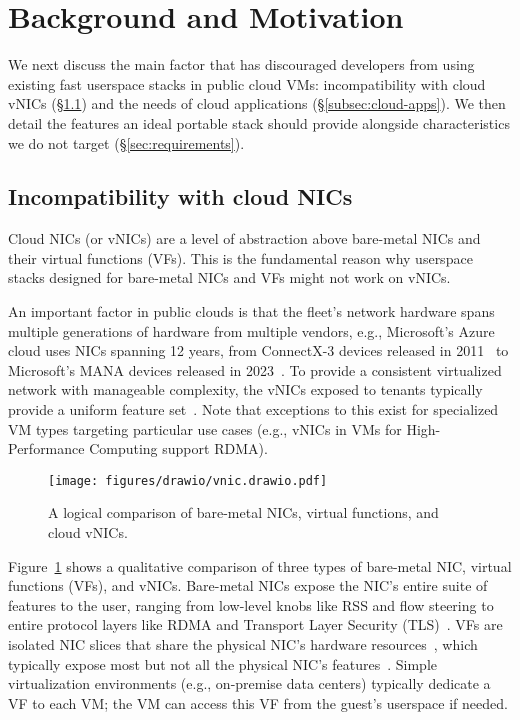 \section{Background and Motivation}
\label{sec:background}
We next discuss the main factor that has discouraged developers from using existing fast userspace stacks in public cloud VMs: incompatibility with cloud vNICs (\S\ref{sec:limitations-of-vnics}) and the needs of cloud applications (\S\ref{subsec:cloud-apps}).
We then detail the features an ideal portable stack should provide alongside characteristics we do not target (\S\ref{sec:requirements}).

\subsection{Incompatibility with cloud NICs}
\label{sec:limitations-of-vnics}
Cloud NICs (or vNICs) are a level of abstraction above bare-metal NICs and their virtual functions (VFs).
This is the fundamental reason why userspace stacks designed for bare-metal NICs and VFs might not work on vNICs.

An important factor in public clouds is that the fleet's network hardware spans multiple generations of hardware from multiple vendors, e.g., Microsoft's Azure cloud uses NICs spanning 12 years, from ConnectX-3 devices released in 2011~\cite{connectx3} to Microsoft's MANA devices released in 2023~\cite{mana, mana-kernel}.
To provide a consistent virtualized network with manageable complexity, the vNICs exposed to tenants typically provide a uniform feature set~\cite{gpoll, ec2poll, netvsc}.
Note that exceptions to this exist for specialized VM types targeting particular use cases (e.g., vNICs in VMs for High-Performance Computing support RDMA).

\begin{figure}[t!]
\centering
\texttt{[image: figures/drawio/vnic.drawio.pdf]}
\caption{A logical comparison of bare-metal NICs, virtual functions, and cloud vNICs.}
\label{fig:diff-nic}
\vspace{-0.1in}
\end{figure}

Figure~\ref{fig:diff-nic} shows a qualitative comparison of three types of bare-metal NIC, virtual functions (VFs), and vNICs.
Bare-metal NICs expose the NIC's entire suite of features to the user, ranging from low-level knobs like RSS and flow steering to entire protocol layers like RDMA and Transport Layer Security (TLS)~\cite{Pismenny:asplos21}.
VFs are isolated NIC slices that share the physical NIC's hardware resources~\cite{vf}, which typically expose most but not all the physical NIC's features~\cite{gpoll, ec2poll, netvsc}.
Simple virtualization environments (e.g., on-premise data centers) typically dedicate a VF to each VM; the VM can access this VF from the guest's userspace if needed.

